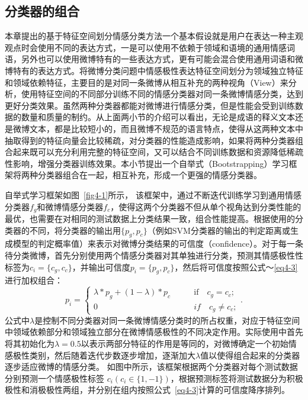\subsection{分类器的组合}
\label{combination}
本章提出的基于特征空间划分情感分类方法一个基本假设就是用户在表达一种主观观点时会使用不同的表达方式，一是可以使用不依赖于领域和语境的通用情感词语，另外也可以使用微博特有的一些表达方式，更有可能会混合使用通用词语和微博特有的表达方式。将微博分类问题中情感极性表达特征空间划分为领域独立特征和领域依赖特征，主要目的是对同一条微博从相互补充的两种视角（View）来分析，使用特征空间的不同部分训练不同的情感分类器对同一条微博情感分类，达到更好分类效果。虽然两种分类器都能对微博进行情感分类，但是性能会受到训练数据的数量和质量的制约。从上面两小节的介绍可以看出，无论是成语的释义文本还是微博文本，都是比较短小的，而且微博不规范的语言特点，使得从这两种文本中抽取得到的特征向量会比较稀疏，对分类器的性能造成影响，如果将两种分类器组合起来既可以充分利用完整的特征空间，又可以结合不同训练数据和资源降低稀疏性影响，增强分类器训练效果。本小节提出一个自举式（Bootstrapping）学习框架将两种分类器组合在一起，相互补充，形成一个更强的情感分类器。

自举式学习框架如图~\ref{fig4-1}所示，
该框架中，通过不断迭代训练学习到通用情感分类器$ f_{g} $和微博情感分类器$ f_{c} $，使得这两个分类器不但从单个视角达到分类性能的最优，也需要在对相同的测试数据上分类结果一致，组合性能提高。根据使用的分类器的不同，将分类器的输出用$  \lbrace p_{g},p_{c}\rbrace$（例如SVM分类器的输出的判定距离或生成模型的判定概率值）来表示对微博分类结果的可信度（confidence）。对于每一条待分类微博，首先分别使用两个情感分类器对其单独进行分类，预测其情感极性性标签为$ c_{i}=\lbrace c_{g},c_{c}\rbrace $，并输出可信度$ p_{i}= \lbrace p_{g},p_{c}\rbrace$，然后将可信度按照公式～\ref{eq4-3}进行加权组合：
\begin{equation}
\label{eq4-3}
p_{i}=\begin{cases}
\lambda\ast p_{g} + \left( 1-\lambda \right) \ast p_{c}&  \qquad \mbox{if} \quad c_{g}=c_{c};\\
0&  \qquad \textit{if} \quad c_{g} \neq c_{c};
\end{cases}.
\end{equation}
公式中$ \lambda $是控制不同分类器对同一条微博情感分类时的所占权重，对应于特征空间中领域依赖部分和领域独立部分在微博情感极性的不同决定作用。实际使用中首先将其初始化为$ \lambda = 0.5 $以表示两部分特征的作用是等同的，对微博确定一个初始情感极性类别，然后随着迭代步数逐步增加，逐渐加大$ \lambda $值以使得组合起来的分类器逐步适应微博的情感分类。
如图中所示，该框架根据两个分类器对每个测试数据分别预测一个情感极性标签 $ c_{i} \left( c_{i} \in \lbrace 1, -1\rbrace \right)$，根据预测标签将测试数据分为积极极性和消极极性两组，并分别在组内按照公式~\ref{eq4-3}计算的可信度降序排列。

